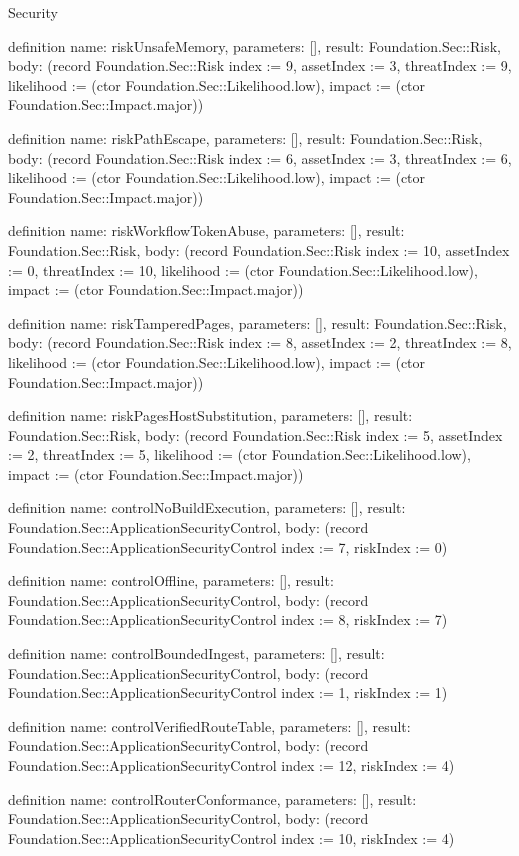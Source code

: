 \begin{lexlean}{Security}
\begin{semanticmodule}
definition{
  name: riskUnsafeMemory,
  parameters: [],
  result: Foundation.Sec::Risk,
  body: (record Foundation.Sec::Risk {index := 9, assetIndex := 3, threatIndex := 9, likelihood := (ctor Foundation.Sec::Likelihood.low), impact := (ctor Foundation.Sec::Impact.major)})
}

definition{
  name: riskPathEscape,
  parameters: [],
  result: Foundation.Sec::Risk,
  body: (record Foundation.Sec::Risk {index := 6, assetIndex := 3, threatIndex := 6, likelihood := (ctor Foundation.Sec::Likelihood.low), impact := (ctor Foundation.Sec::Impact.major)})
}

definition{
  name: riskWorkflowTokenAbuse,
  parameters: [],
  result: Foundation.Sec::Risk,
  body: (record Foundation.Sec::Risk {index := 10, assetIndex := 0, threatIndex := 10, likelihood := (ctor Foundation.Sec::Likelihood.low), impact := (ctor Foundation.Sec::Impact.major)})
}

definition{
  name: riskTamperedPages,
  parameters: [],
  result: Foundation.Sec::Risk,
  body: (record Foundation.Sec::Risk {index := 8, assetIndex := 2, threatIndex := 8, likelihood := (ctor Foundation.Sec::Likelihood.low), impact := (ctor Foundation.Sec::Impact.major)})
}

definition{
  name: riskPagesHostSubstitution,
  parameters: [],
  result: Foundation.Sec::Risk,
  body: (record Foundation.Sec::Risk {index := 5, assetIndex := 2, threatIndex := 5, likelihood := (ctor Foundation.Sec::Likelihood.low), impact := (ctor Foundation.Sec::Impact.major)})
}

definition{
  name: controlNoBuildExecution,
  parameters: [],
  result: Foundation.Sec::ApplicationSecurityControl,
  body: (record Foundation.Sec::ApplicationSecurityControl {index := 7, riskIndex := 0})
}

definition{
  name: controlOffline,
  parameters: [],
  result: Foundation.Sec::ApplicationSecurityControl,
  body: (record Foundation.Sec::ApplicationSecurityControl {index := 8, riskIndex := 7})
}

definition{
  name: controlBoundedIngest,
  parameters: [],
  result: Foundation.Sec::ApplicationSecurityControl,
  body: (record Foundation.Sec::ApplicationSecurityControl {index := 1, riskIndex := 1})
}

definition{
  name: controlVerifiedRouteTable,
  parameters: [],
  result: Foundation.Sec::ApplicationSecurityControl,
  body: (record Foundation.Sec::ApplicationSecurityControl {index := 12, riskIndex := 4})
}

definition{
  name: controlRouterConformance,
  parameters: [],
  result: Foundation.Sec::ApplicationSecurityControl,
  body: (record Foundation.Sec::ApplicationSecurityControl {index := 10, riskIndex := 4})
}


\end{semanticmodule}
\end{lexlean}
